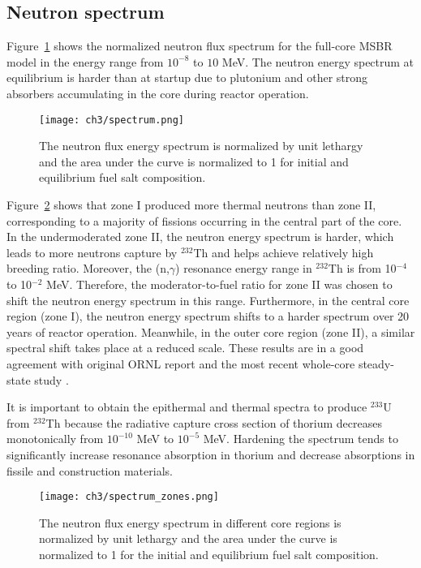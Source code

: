 \subsection{Neutron spectrum}
Figure~\ref{fig:spectrum} shows the normalized neutron flux spectrum for the 
full-core \gls{MSBR} model in the energy range from $10^{-8}$ to $10$ MeV. The 
neutron energy spectrum at equilibrium is harder than at startup due to 
plutonium and other strong absorbers accumulating in the core during reactor 
operation.  
\begin{figure}[ht!] %
	\centering
	\texttt{[image: ch3/spectrum.png]}
	\caption{The neutron flux energy spectrum is normalized by unit lethargy 
	and the area under the curve is normalized to 1 for initial and equilibrium 
	fuel salt composition.}
	\label{fig:spectrum}
\end{figure}

Figure~\ref{fig:spectrum_zones} shows that zone I produced more thermal  
neutrons than zone II, corresponding to a majority of fissions occurring in the 
central part of the core. In the undermoderated zone II, the neutron energy 
spectrum is harder, which leads to more neutrons capture by $^{232}$Th and 
helps achieve relatively high breeding ratio. Moreover, the (n,$\gamma$) 
resonance energy range in $^{232}$Th is from 10$^{-4}$ to 10$^{-2}$ MeV. 
Therefore, the moderator-to-fuel ratio for zone II was chosen to shift the 
neutron energy spectrum in this range. Furthermore, in the central core region 
(zone I), the neutron energy spectrum shifts to a harder spectrum over 20 years 
of reactor operation. Meanwhile, in the outer core region (zone II), a 
similar spectral shift takes place at a reduced scale. These results are in a 
good agreement with original ORNL report \cite{robertson_conceptual_1971} and 
the most recent whole-core steady-state study \cite{park_whole_2015}.

It is important to obtain the epithermal and thermal spectra to produce 
$^{233}$U from $^{232}$Th because the radiative capture cross section of 
thorium decreases monotonically from $10^{-10}$ MeV to $10^{-5}$ MeV. Hardening 
the spectrum tends to significantly increase resonance absorption in thorium 
and decrease absorptions in fissile and construction materials. 
\begin{figure}[ht!] %
	\centering
	\texttt{[image: ch3/spectrum\_zones.png]} 
	\caption{The neutron flux energy spectrum in different core regions is 
	normalized by unit lethargy and the area under the curve is normalized to 1 
	for the initial and equilibrium fuel salt composition.}
	\label{fig:spectrum_zones}
\end{figure}

